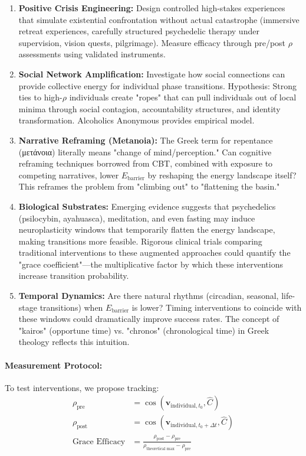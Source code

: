 \documentclass[11pt,a4paper]{article}
\theoremstyle{definition}
\theoremstyle{remark}
\begin{document}
\begin{enumerate}
    \item \textbf{Positive Crisis Engineering:} Design controlled high-stakes experiences that simulate existential confrontation without actual catastrophe (immersive retreat experiences, carefully structured psychedelic therapy under supervision, vision quests, pilgrimage). Measure efficacy through pre/post \(\rho\) assessments using validated instruments.
    
    \item \textbf{Social Network Amplification:} Investigate how social connections can provide collective energy for individual phase transitions. Hypothesis: Strong ties to high-\(\rho\) individuals create "ropes" that can pull individuals out of local minima through social contagion, accountability structures, and identity transformation. Alcoholics Anonymous provides empirical model.
    
    \item \textbf{Narrative Reframing (Metanoia):} The Greek term for repentance (μετάνοια) literally means "change of mind/perception." Can cognitive reframing techniques borrowed from CBT, combined with exposure to competing narratives, lower \(E_{\text{barrier}}\) by reshaping the energy landscape itself? This reframes the problem from "climbing out" to "flattening the basin."
    
    \item \textbf{Biological Substrates:} Emerging evidence suggests that psychedelics (psilocybin, ayahuasca), meditation, and even fasting may induce neuroplasticity windows that temporarily flatten the energy landscape, making transitions more feasible. Rigorous clinical trials comparing traditional interventions to these augmented approaches could quantify the "grace coefficient"—the multiplicative factor by which these interventions increase transition probability.
    
    \item \textbf{Temporal Dynamics:} Are there natural rhythms (circadian, seasonal, life-stage transitions) when \(E_{\text{barrier}}\) is lower? Timing interventions to coincide with these windows could dramatically improve success rates. The concept of "kairos" (opportune time) vs. "chronos" (chronological time) in Greek theology reflects this intuition.
\end{enumerate}

\paragraph{Measurement Protocol:}
To test interventions, we propose tracking:
\begin{align}
    \rho_{\text{pre}} &= \cos(\mathbf{v}_{\text{individual}, t_0}, \hat{C}) \\
    \rho_{\text{post}} &= \cos(\mathbf{v}_{\text{individual}, t_0 + \Delta t}, \hat{C}) \\
    \text{Grace Efficacy} &= \frac{\rho_{\text{post}} - \rho_{\text{pre}}}{\rho_{\text{theoretical max}} - \rho_{\text{pre}}}
\end{align}
\end{document}
